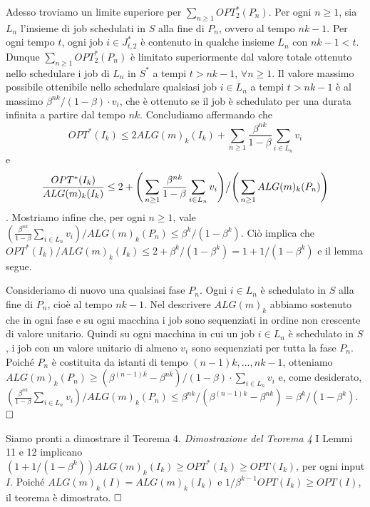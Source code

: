 \documentclass[twoside,openany,titlepage,fleqn,
	headinclude,12pt,a4paper,BCOR5mm,footinclude]{scrbook}
\begin{document}
Adesso troviamo un limite superiore per $\sum_{n \geq 1} OPT^{*}_{2}(P_{n})$. Per ogni $n \geq 1$, sia $L_{n}$ l'insieme di job schedulati in $S$ alla fine di $P_{n}$, ovvero al tempo $nk - 1$. Per ogni tempo $t$, ogni job $i \in J_{t,2}^{*}$ è contenuto in qualche insieme $L_{n}$ con $nk - 1 <t$. Dunque $\sum_{n \geq 1} OPT^{*}_{2}(P_{n})$ è limitato superiormente dal valore totale ottenuto nello schedulare i job di $L_{n}$ in $S^{*}$ a tempi $t > nk - 1$, $\forall n \geq 1$. Il valore massimo possibile ottenibile nello schedulare qualsiasi job $i \in L_{n}$ a tempi $t> nk - 1$ è al massimo $\beta^{nk} / (1 - \beta) \cdot v_{i}$, che è ottenuto se il job è schedulato per una durata infinita a partire dal tempo $nk$. Concludiamo affermando che
$$OPT^{*}(I_{k}) \leq 2ALG(m)_{k}(I_{k}) + \sum_{n \geq 1} \frac{\beta^{nk}} {1 - \beta } \sum_{i \in L_{n}} v_{i} $$
e 
$$\frac{OPT^{*}(I_{k})} {ALG(m)_{k}(I_{k})} \leq 2 + \Bigg( \sum_{n \geq 1} \frac{\beta^{nk}} {1 - \beta} \sum_{i \in L_{n}} v_{i} \Bigg) \big{\slash} \Bigg( \sum_{n \geq 1} ALG(m)_{k}(P_{n}) \Bigg)$$.
Mostriamo infine che, per ogni $n \geq 1$, vale $(\frac {\beta^{nk}}{1 - \beta} \sum_{i \in L_{n}} v_{i}) / ALG(m)_{k}(P_{n}) \leq \beta^{k} / (1 - \beta^{k}).$  Ciò implica che $OPT^{*}(I_{k}) / ALG(m)_{k}(I_{k}) \leq 2 + \beta^{k} / (1 - \beta^{k}) = 1 + 1 / (1- \beta^{k})$ e il lemma segue.

Consideriamo di nuovo una qualsiasi fase $P_{n}$. Ogni $i \in L_{n}$ è schedulato in $S$ alla fine di $P_{n}$, cioè al tempo $nk - 1$. Nel descrivere $ALG(m)_{k}$ abbiamo sostenuto che in ogni fase e su ogni macchina i job sono sequenziati in ordine non crescente di valore unitario. Quindi su ogni macchina in cui un job $i \in L_{n}$ è schedulato in $S$, i job con un valore unitario di almeno $v_{i}$ sono sequenziati per tutta la fase $P_{n}$. Poiché $P_{n}$ è costituita da istanti di tempo $(n - 1) k ,..., nk - 1$, otteniamo $ALG(m)_{k}(P_{n}) \geq (\beta^{(n - 1) k} - \beta^{nk}) / (1 - \beta) \cdot \sum_{i \in L_{n}} v_{i}$ e, come desiderato, $(\frac{\beta^{nk}} {1 - \beta} \sum_{i \in L_{n}} v_{i}) / ALG(m)_{k}(P_{n}) \leq \beta^{nk} / (\beta^{(n - 1) k} - \beta^{nk}) = \beta^{k} / (1 - \beta^{k}).$ $\hfill \square$

Siamo pronti a dimostrare il Teorema 4.
\newline \newline
\textit{Dimostrazione del Teorema 4} I Lemmi 11 e 12 implicano $(1 + 1 / (1 - \beta^{k}))ALG(m)_{k}(I_{k}) \geq OPT^{*}(I_{k}) \geq OPT (I_{k})$, per ogni input $I$. Poiché $ALG(m)_{k}(I) = ALG(m)_{k}(I_{k})$ e $1 / \beta^{k-1}OPT (I_{k}) \geq OPT (I)$, il teorema è dimostrato. $\hfill \square$
\end{document}
